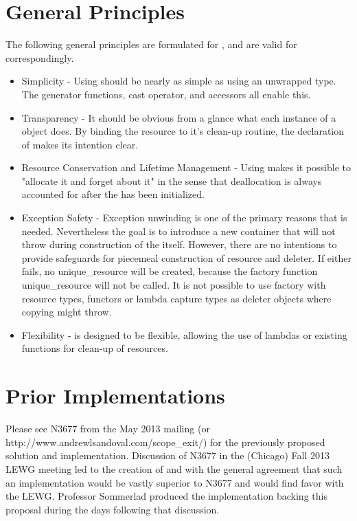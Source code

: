 \documentclass[ebook,11pt,article]{memoir}
\begin{document}
\section{General Principles}
The following general principles are formulated for , and are valid for  correspondingly.
\begin{itemize}
\item Simplicity - Using  should be nearly as simple as using an unwrapped type.  The generator functions, cast operator, and accessors all enable this.
\item Transparency - It should be obvious from a glance what each instance of a  object does.  By binding the resource to it's clean-up routine, the declaration of  makes its intention clear.
\item Resource Conservation and Lifetime Management - Using  makes it possible to "allocate it and forget about it" in the sense that deallocation is always accounted for after the  has been initialized.
\item Exception Safety - Exception unwinding is one of the primary reasons that  is needed.  Nevertheless the goal is to introduce a new container that will not throw during construction of the  itself. However, there are no intentions to provide safeguards for piecemeal construction of resource and deleter. If either fails, no unique_resource will be created, because the factory function unique_resource will not be called. It is not possible to use  factory with resource types, functors or lambda capture types as deleter objects where copying might throw.
\item Flexibility -  is designed to be flexible, allowing the use of lambdas or existing functions for clean-up of resources. 
\end{itemize}

\section{Prior Implementations}
Please see N3677 from the May 2013 mailing (or http://www.andrewlsandoval.com/scope_exit/) for the previously proposed solution and implementation.  Discussion of N3677 in the (Chicago) Fall 2013 LEWG meeting led to the creation of  and  with the general agreement that such an implementation would be vastly superior to N3677 and would find favor with the LEWG.  Professor Sommerlad produced the implementation backing this proposal during the days following that discussion.
\end{document}
